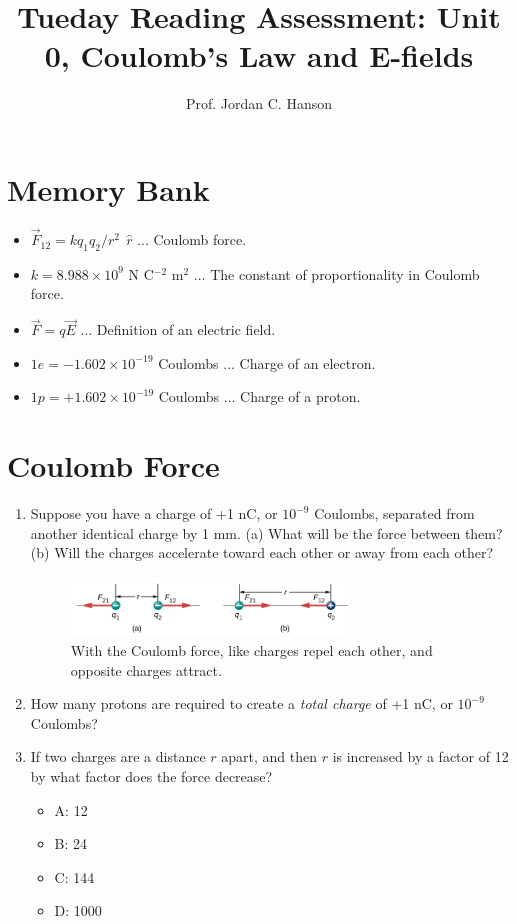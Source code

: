 \documentclass{article}
\begin{document}
\title{Tueday Reading Assessment: Unit 0, Coulomb's Law and E-fields}
\author{Prof. Jordan C. Hanson}

\maketitle

\section{Memory Bank}

\begin{itemize}
\item $\vec{F}_{12} = k q_1 q_2 / r^2 ~~\hat{r}$ ... Coulomb force.
\item $k = 8.988 \times 10^{9}$ N C$^{-2}$ m$^{2}$ ... The constant of proportionality in Coulomb force.
\item $\vec{F} = q\vec{E}$ ... Definition of an electric field.
\item $1e = -1.602 \times 10^{-19}$ Coulombs ... Charge of an electron.
\item $1p = +1.602 \times 10^{-19}$ Coulombs ... Charge of a proton.
\end{itemize}

\section{Coulomb Force}

\begin{enumerate}
\item Suppose you have a charge of +1 nC, or $10^{-9}$ Coulombs, separated from another identical charge by 1 mm.  (a) What will be the force between them? (b) Will the charges accelerate toward each other or away from each other? \\ \vspace{2cm}
\begin{figure}[ht]
\centering
\includegraphics[width=0.7\textwidth]{Coul.png}
\caption{\label{fig:coul} With the Coulomb force, like charges repel each other, and opposite charges attract.}
\end{figure}
\item How many protons are required to create a \textit{total charge} of +1 nC, or $10^{-9}$ Coulombs? \\ \vspace{1cm}
\item If two charges are a distance $r$ apart, and then $r$ is increased by a factor of 12 by what factor does the force decrease?
\begin{itemize}
\item A: 12
\item B: 24
\item C: 144
\item D: 1000
\end{itemize}
\end{enumerate}
\end{document}
